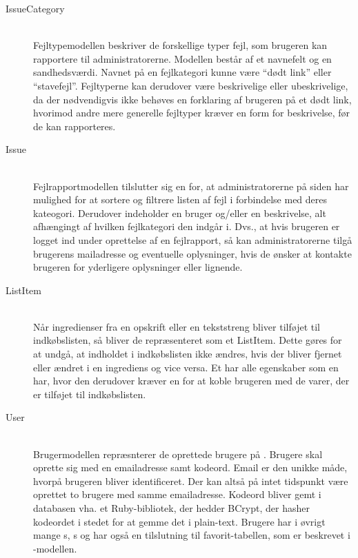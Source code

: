 \begin{description}
  \item[IssueCategory] \hfill \\
    Fejltypemodellen beskriver de forskellige typer fejl, som brugeren kan rapportere til administratorerne. Modellen består af et navnefelt og en sandhedsværdi. Navnet på en fejlkategori kunne \fx være ``dødt link'' eller ``stavefejl''. Fejltyperne kan derudover være beskrivelige eller ubeskrivelige, da der nødvendigvis ikke behøves en forklaring af brugeren på \fx et dødt link, hvorimod andre mere generelle fejltyper kræver en form for beskrivelse, før de kan rapporteres.

  \item[Issue] \hfill \\
    Fejlrapportmodellen tilslutter sig en  for, at administratorerne på siden har mulighed for at sortere og filtrere listen af fejl i forbindelse med deres kateogori. Derudover indeholder  en bruger og/eller en beskrivelse, alt afhængingt af hvilken fejlkategori den indgår i. Dvs., at hvis brugeren er logget ind under oprettelse af en fejlrapport, så kan administratorerne tilgå brugerens mailadresse og eventuelle oplysninger, hvis de ønsker at kontakte brugeren for yderligere oplysninger eller lignende.

  \item[ListItem] \hfill \\
    Når ingredienser fra en opskrift eller en tekststreng bliver tilføjet til indkøbslisten, så bliver de repræsenteret som et ListItem. Dette gøres for at undgå, at indholdet i indkøbslisten ikke ændres, hvis der bliver fjernet eller ændret i en ingrediens  og vice versa. Et  har alle egenskaber som en  har, hvor den derudover kræver en  for at koble brugeren med de varer, der er tilføjet til indkøbslisten.

  \item[User] \hfill \\
    Brugermodellen repræsnterer de oprettede brugere på \Foodl{}. Brugere skal oprette sig med en emailadresse samt kodeord. Email er den unikke måde, hvorpå brugeren bliver identificeret. Der kan altså på intet tidspunkt være oprettet to brugere med samme emailadresse. Kodeord bliver gemt i databasen vha. et Ruby-bibliotek, der hedder BCrypt, der hasher kodeordet i stedet for at gemme det i plain-text. Brugere har i øvrigt mange s, s og har også en tilslutning til favorit-tabellen, som er beskrevet i -modellen.

\end{description}

